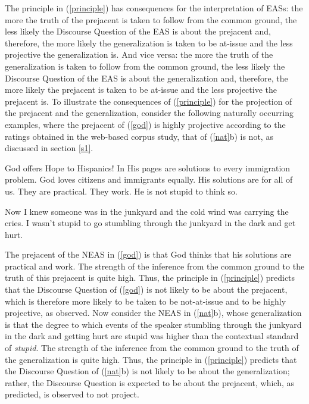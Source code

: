 \documentclass[11pt,fleqn]{article}
\newcommand{\6}{\mbox{$[\hspace*{-.6mm}[$}}
\newcommand{\9}{\mbox{$]\hspace*{-.6mm}]$}}
\begin{document}
The principle in (\ref{principle}) has consequences for the interpretation of EASs: the more the truth of the prejacent is taken to follow from the common ground, the less likely the Discourse Question of the EAS is about the prejacent and, therefore, the more likely the generalization is taken to be at-issue and the less projective the generalization is. And vice versa: the more the truth of the generalization is taken to follow from the common ground, the less likely the Discourse Question of the EAS is about the generalization and, therefore, the more likely the prejacent is taken to be at-issue and the less projective the prejacent is. To illustrate the consequences of (\ref{principle}) for the projection of the prejacent and the generalization, consider the following naturally occurring examples, where the prejacent of (\ref{god}) is highly projective according to the ratings obtained in the web-based corpus study, that of (\ref{nat}b) is not, as discussed in section \ref{s1}.

\begin{exe}

\ex\label{god} God offers Hope to Hispanics! In His pages are solutions to every immigration problem. God loves citizens and immigrants equally. His solutions are for all of us. They are practical. They work. He is not stupid to think so.

  Now I knew someone was in the junkyard and the cold wind was
carrying the cries. I wasn't stupid to go stumbling through the
junkyard in the dark and get hurt.

\end{exe}
The prejacent of the NEAS in (\ref{god}) is that God thinks that his solutions are practical and work. The strength of the inference from the common ground to the truth of this prejacent is quite high. Thus, the principle in (\ref{principle}) predicts that the Discourse Question of (\ref{god}) is not likely to be about the prejacent, which is therefore more likely to be taken to be not-at-issue and to be highly projective, as observed. Now consider the NEAS in (\ref{nat}b), whose generalization is that the degree to which events of the speaker stumbling through the junkyard in the dark and getting hurt are stupid was higher than the contextual standard of {\em stupid}. The strength of the inference from the common ground to the truth of the generalization is quite high. Thus, the principle in (\ref{principle}) predicts that the Discourse Question of (\ref{nat}b) is not likely to be about the generalization; rather, the Discourse Question is expected to be about the prejacent, which, as predicted, is observed to not project. 
\end{document}
